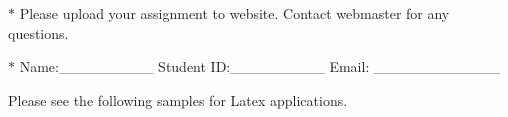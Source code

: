 \documentclass[12pt,a4paper]{article}
\theoremstyle{definition}
\begin{document}
\noindent

\noindent{}
\begin{center}
\footnotesize{\color{red}$*$ Please upload your assignment to website. Contact webmaster for any questions.}

\footnotesize{\color{blue}$*$ Name:\_\_\_\_\_\_\_\_\_  \quad Student ID:\_\_\_\_\_\_\_\_\_ \quad Email: \_\_\_\_\_\_\_\_\_\_\_\_}
\end{center}

{\color{purple}Please see the following samples for Latex applications.}
\end{document}
